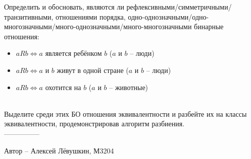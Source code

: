 \question
Определить и обосновать, являются ли рефлексивными/симметричными/транзитивными, отношениями порядка, одно-однозначными/одно-многозначными/много-однозначными/много-многозначными бинарные отношения:
\begin{itemize}
    \item $aRb \Leftrightarrow a$ является ребёнком $b$ ($a$ и $b$ -- люди)
    \item $aRb \Leftrightarrow a$ и $b$ живут в одной стране ($a$ и $b$ -- люди)
    \item $aRb \Leftrightarrow a$ охотится на $b$ ($a$ и $b$ -- животные)
\end{itemize}
\\
Выделите среди этих БО отношения эквивалентности и разбейте их на классы эквивалентности, продемонстрировав алгоритм разбиения.
\\
---------------

Автор -- Алексей Лёвушкин, М3204